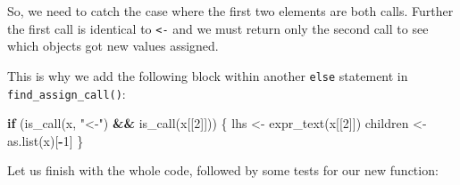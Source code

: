 \documentclass[
]{krantz}
\makeatletter
\newenvironment{Shaded}{\begin{snugshade}}{\end{snugshade}}
\newcommand{\ControlFlowTok}[1]{\textcolor[rgb]{0.13,0.29,0.53}{\textbf{#1}}}
\newcommand{\DecValTok}[1]{\textcolor[rgb]{0.00,0.00,0.81}{#1}}
\newcommand{\KeywordTok}[1]{\textcolor[rgb]{0.13,0.29,0.53}{\textbf{#1}}}
\newcommand{\NormalTok}[1]{#1}
\newcommand{\OperatorTok}[1]{\textcolor[rgb]{0.81,0.36,0.00}{\textbf{#1}}}
\newcommand{\StringTok}[1]{\textcolor[rgb]{0.31,0.60,0.02}{#1}}
\newenvironment{kframe}{%
\medskip{}
\setlength{\fboxsep}{.8em}
 \def\at@end@of@kframe{}%
 \ifinner\ifhmode%
  \def\at@end@of@kframe{\end{minipage}}%
  \begin{minipage}{\columnwidth}%
 \fi\fi%
 \def\FrameCommand##1{\hskip\@totalleftmargin \hskip-\fboxsep
 \colorbox{shadecolor}{##1}\hskip-\fboxsep
     \hskip-\linewidth \hskip-\@totalleftmargin \hskip\columnwidth}%
 \MakeFramed {\advance\hsize-\width
   \@totalleftmargin\z@ \linewidth\hsize
   \@setminipage}}%
 {\par\unskip\endMakeFramed%
 \at@end@of@kframe}
\renewenvironment{Shaded}{\begin{kframe}}{\end{kframe}}
\renewcommand{\KeywordTok} [1]{\textcolor[rgb]{0.00,0.44,0.13}{{#1}}}
\renewcommand{\DecValTok}  [1]{\textcolor[rgb]{0.25,0.63,0.44}{{#1}}}
\renewcommand{\StringTok}  [1]{\textcolor[rgb]{0.25,0.44,0.63}{{#1}}}
\renewcommand{\NormalTok}  [1]{{#1}}
\makeatother
\begin{document}
So, we need to catch the case where the first two elements are both calls. Further the first call is identical to \texttt{\textless{}-} and we must return only the second call to see which objects got new values assigned.

This is why we add the following block within another \texttt{else} statement in \texttt{find\_assign\_call()}:

\begin{Shaded}
\begin{Highlighting}[]
\ControlFlowTok{if}\NormalTok{ (}\KeywordTok{is_call}\NormalTok{(x, }\StringTok{"<-"}\NormalTok{) }\OperatorTok{&&}\StringTok{ }\KeywordTok{is_call}\NormalTok{(x[[}\DecValTok{2}\NormalTok{]])) \{}
\NormalTok{  lhs <-}\StringTok{ }\KeywordTok{expr_text}\NormalTok{(x[[}\DecValTok{2}\NormalTok{]])}
\NormalTok{  children <-}\StringTok{ }\KeywordTok{as.list}\NormalTok{(x)[}\OperatorTok{-}\DecValTok{1}\NormalTok{]}
\NormalTok{\}}
\end{Highlighting}
\end{Shaded}

Let us finish with the whole code, followed by some tests for our new function:
\end{document}
